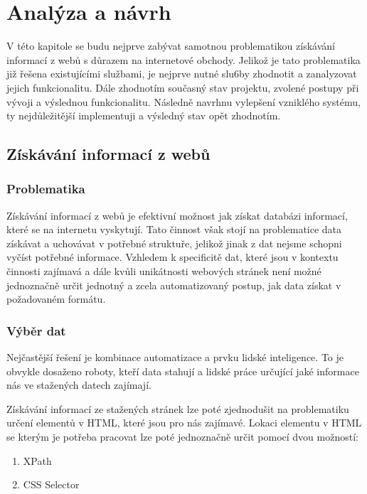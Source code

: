 \documentclass[thesis=B,czech]{FITthesis}[2012/06/26]
\begin{document}
\newpage


\chapter{Analýza a návrh}

V této kapitole se budu nejprve zabývat samotnou problematikou získávání informací 
z webů s důrazem na internetové obchody.
Jelikož je tato problematika již řešena existujícími službami, je nejprve nutné slu6by zhodnotit a zanalyzovat jejich funkcionalitu.
Dále zhodnotím současný stav projektu, zvolené postupy při vývoji a výslednou funkcionalitu.
Následně navrhnu vylepšení vzniklého systému, ty nejdůležitější implementuji a výsledný stav opět zhodnotím.

\section{Získávání informací z webů}

\subsection{Problematika}
Získávání informací z webů je efektivní možnost jak získat databázi informací, které se na internetu vyskytují.
Tato činnost však stojí na problematice data získávat a uchovávat v potřebné struktuře, jelikož 
jinak z dat nejsme schopni vyčíst potřebné informace.
Vzhledem k specificitě dat, které jsou v kontextu činnosti zajímavá a dále kvůli unikátnosti webových stránek
není možné jednoznačně určit jednotný a zcela automatizovaný postup, jak data získat v požadovaném formátu.

\newpage

\subsection{Výběr dat}
Nejčastější řešení je kombinace automatizace a prvku lidské inteligence.
To je obvykle dosaženo roboty, kteří data stahují a lidské práce určující jaké informace nás ve stažených datech zajímají.
\par
Získávání informací ze stažených stránek lze poté zjednodušit na problematiku určení elementů v HTML, které jsou pro 
nás zajímavé.
Lokaci elementu v HTML se kterým je potřeba pracovat lze poté jednoznačně určit pomocí dvou možností:
\begin{enumerate}
\item XPath
\item CSS Selector
\end{enumerate}
\end{document}
